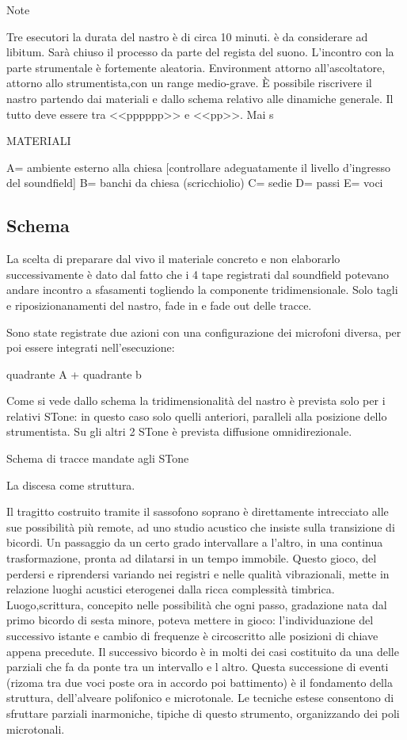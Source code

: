 Note 

Tre esecutori                                                            
la durata del nastro è di circa 10 minuti.
è da considerare ad libitum. Sarà chiuso il processo da parte del regista del suono.
L'incontro con la parte strumentale è fortemente aleatoria. Environment attorno all’ascoltatore, attorno allo strumentista,con un range medio-grave. È possibile riscrivere il nastro partendo dai materiali e dallo schema relativo alle dinamiche generale. Il tutto deve essere tra <<pppppp>> e <<pp>>. Mai s

MATERIALI

A= ambiente esterno alla chiesa [controllare adeguatamente il livello d'ingresso del soundfield]
B= banchi da chiesa (scricchiolio)
C= sedie
D= passi
E= voci




\subsection{Schema}

La scelta di preparare  dal vivo il materiale  concreto e non elaborarlo successivamente
è dato dal fatto che i 4 tape registrati dal soundfield potevano andare incontro a
sfasamenti togliendo la componente tridimensionale. Solo tagli e riposizionanamenti
del nastro, fade in e fade out delle tracce.

Sono state registrate due azioni con una configurazione dei microfoni diversa,
per poi essere integrati nell'esecuzione:

quadrante A            +             quadrante b


Come si vede dallo schema la tridimensionalità del nastro è prevista solo per i relativi STone:
in questo caso solo quelli anteriori, paralleli alla posizione dello strumentista.
Su gli altri 2 STone è prevista diffusione omnidirezionale.

Schema di tracce mandate agli STone

La discesa come struttura.

Il tragitto costruito tramite il sassofono soprano è direttamente intrecciato alle sue
possibilità più remote, ad uno studio acustico che insiste sulla transizione di bicordi.
Un passaggio da un certo grado intervallare a l’altro, in una continua trasformazione, 
pronta ad dilatarsi in un tempo immobile. Questo gioco, del perdersi e riprendersi
variando nei registri e nelle  qualità vibrazionali, mette in relazione luoghi
acustici eterogenei dalla ricca complessità timbrica.
Luogo,scrittura, concepito nelle possibilità che ogni passo, gradazione nata dal
primo bicordo di sesta minore, poteva mettere in gioco: l’individuazione del successivo
istante e cambio di frequenze è circoscritto alle posizioni di chiave appena precedute.
Il successivo bicordo è in molti dei casi costituito da una delle parziali che fa da
ponte tra un intervallo e l altro. 
Questa successione di eventi (rizoma tra due voci poste ora in accordo poi battimento)
è il fondamento della struttura, dell’alveare polifonico e microtonale.
Le tecniche estese consentono di sfruttare parziali inarmoniche, tipiche di questo
strumento, organizzando dei poli microtonali. 

